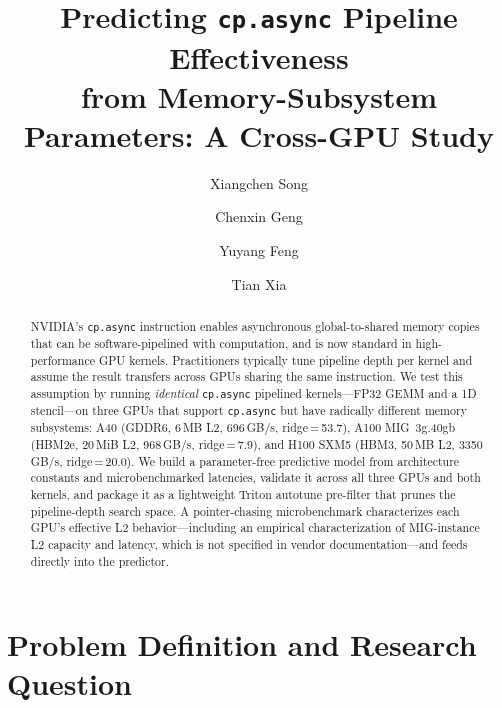 \documentclass[sigplan,nonacm,10pt]{acmart}
\begin{document}
\title{Predicting \texttt{cp.async} Pipeline Effectiveness\\
from Memory-Subsystem Parameters: A Cross-GPU Study}

\author{Xiangchen Song}
\author{Chenxin Geng}
\author{Yuyang Feng}
\author{Tian Xia}

\begin{abstract}
NVIDIA's \texttt{cp.async} instruction enables asynchronous
global-to-shared memory copies that can be software-pipelined with
computation, and is now standard in high-performance GPU kernels.
Practitioners typically tune pipeline depth per kernel and assume the
result transfers across GPUs sharing the same instruction.
We test this assumption by running \emph{identical} \texttt{cp.async}
pipelined kernels---FP32 GEMM and a 1D stencil---on three GPUs that
support \texttt{cp.async} but have radically different memory subsystems:
A40 (GDDR6, 6\,MB L2, 696\,GB/s, ridge\,=\,53.7),
A100 MIG~3g.40gb (HBM2e, 20\,MiB L2, 968\,GB/s, ridge\,=\,7.9), and
H100 SXM5 (HBM3, 50\,MB L2, 3350\,GB/s, ridge\,=\,20.0).
We build a parameter-free predictive model from architecture constants
and microbenchmarked latencies, validate it across all three GPUs and
both kernels, and package it as a lightweight Triton autotune pre-filter
that prunes the pipeline-depth search space.
A pointer-chasing microbenchmark characterizes each GPU's effective L2
behavior---including an empirical characterization of MIG-instance L2
capacity and latency, which is not specified in vendor
documentation---and feeds directly into the predictor.
\end{abstract}

\maketitle

\section{Problem Definition and Research Question}
\label{sec:problem}
\end{document}
